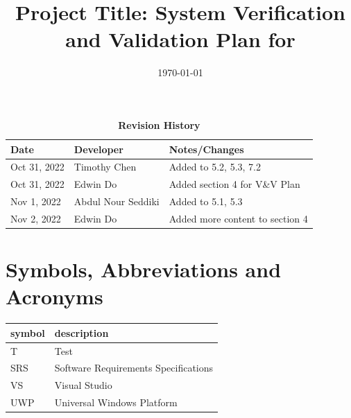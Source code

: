 \documentclass[12pt, titlepage]{article}
\begin{document}
\title{Project Title: System Verification and Validation Plan for \progname{}} 
\author{\authname}
\date{\today}
	
\maketitle


\begin{table}[H]
  \caption{\bf Revision History}
  \begin{tabularx}{\textwidth}{p{2.5cm}p{2.5cm}X}
  \toprule {\bf Date} & {\bf Developer} & {\bf Notes/Changes}\\
  \midrule
  Oct 31, 2022 & Timothy Chen & Added to 5.2, 5.3, 7.2\\
  Oct 31, 2022 & Edwin Do & Added section 4 for V\&V Plan\\
  Nov 1, 2022 & Abdul Nour Seddiki & Added to 5.1, 5.3\\
  Nov 2, 2022 & Edwin Do & Added more content to section 4 \\
  \bottomrule
  \end{tabularx}
  \end{table}
  

\newpage

\tableofcontents

\listoftables
{}

\listoffigures
{}

\newpage

\section{Symbols, Abbreviations and Acronyms}

\renewcommand{\arraystretch}{1.2}
\begin{tabular}{l l} 
  \toprule		
  \textbf{symbol} & \textbf{description}\\
  \midrule 
  T & Test\\
  SRS & Software Requirements Specifications \\
  VS & Visual Studio\\
  UWP & Universal Windows Platform\\
  \bottomrule
\end{tabular}\\

\end{document}
